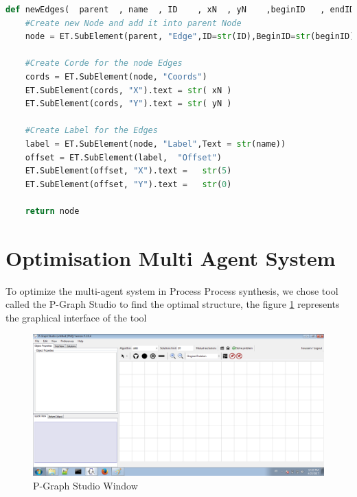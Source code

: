 \begin{lstlisting}[language=Python, caption=Python Function new Edges]
def newEdges(  parent  , name  , ID    , xN  , yN    ,beginID   , endID    ):
	#Create new Node and add it into parent Node	
	node = ET.SubElement(parent, "Edge",ID=str(ID),BeginID=str(beginID),EndID=str(endID),Rate=str(name),Title=str(name) , ArrowOnCenter="true" , ArrowPosition="50")  
	
	#Create Corde for the node Edges
	cords = ET.SubElement(node, "Coords")
	ET.SubElement(cords, "X").text = str( xN )
	ET.SubElement(cords, "Y").text = str( yN )
		 		 		  
	#Create Label for the Edges
	label = ET.SubElement(node, "Label",Text = str(name))
	offset = ET.SubElement(label,  "Offset")
	ET.SubElement(offset, "X").text =   str(5)
	ET.SubElement(offset, "Y").text =   str(0)
 
	return node 
\end{lstlisting}


\pagebreak
\section{ Optimisation Multi Agent System }

To optimize the multi-agent system in  Process Process synthesis, we chose tool called the P-Graph Studio 
to find the optimal structure, the figure \ref{fig:pgraphstudio)} represents the graphical interface of the tool

\begin{figure}[th]
	\centering  %
 	\includegraphics[scale=0.44]{Chapiter3/img/pgraph}
	\caption{\label{fig:pgraphstudio)}P-Graph Studio Window }
\end{figure}  


